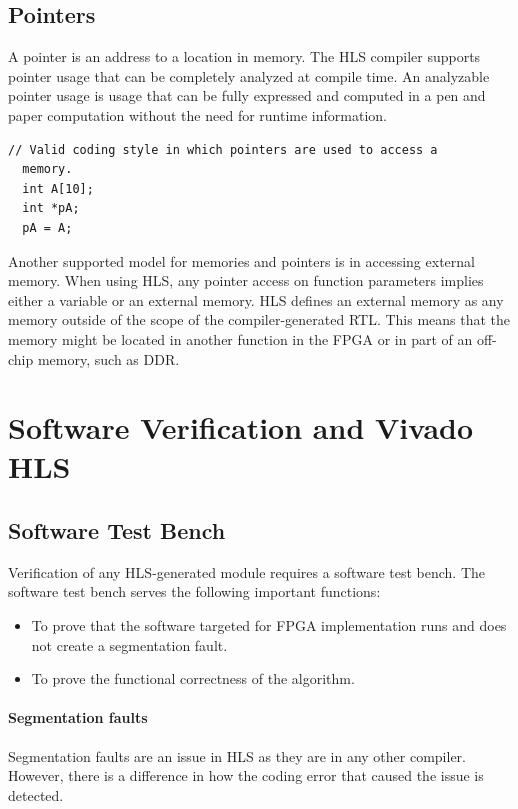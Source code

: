 \subsection{Pointers}  
A pointer is an address to a location in memory. The HLS compiler supports pointer usage that can be completely
analyzed at compile time. An analyzable pointer usage is usage that can be fully expressed
and computed in a pen and paper computation without the need for runtime information.
  
\begin{lstlisting}[style=CStyle]
  // Valid coding style in which pointers are used to access a
  memory.
  int A[10];
  int *pA;
  pA = A;
\end{lstlisting}      
  

Another supported model for memories and pointers is in accessing external memory.
When using HLS, any pointer access on function parameters implies either a variable or an
external memory. HLS defines an external memory as any memory outside of the scope of
the compiler-generated RTL. This means that the memory might be located in another
function in the FPGA or in part of an off-chip memory, such as DDR.


\clearpage

\section{Software Verification and Vivado HLS}
\subsection{Software Test Bench}
Verification of any HLS-generated module requires a software test bench. The software test
bench serves the following important functions:
\begin{itemize}
    \item To prove that the software targeted for FPGA implementation runs and does not create a segmentation fault.
    \item To prove the functional correctness of the algorithm.
\end{itemize}

\paragraph{Segmentation faults}
Segmentation faults are an issue in HLS as they are in any other compiler. However, there is a difference in how the coding error that caused the issue is detected. 

